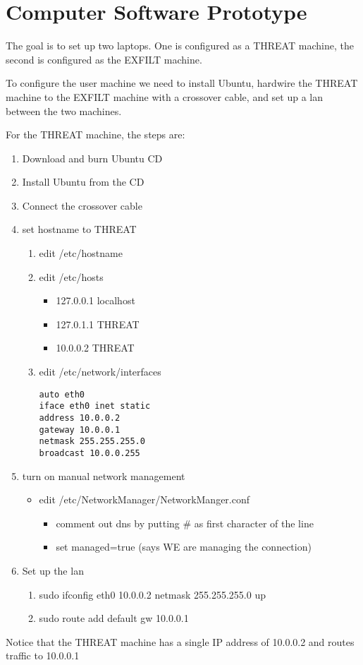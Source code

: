 \chapter{Computer Software Prototype}

The goal is to set up two laptops. One is configured as a THREAT
machine, the second is configured as the EXFILT machine.

To configure the user machine we need to install Ubuntu,
hardwire the THREAT machine to the EXFILT machine with a
crossover cable, and set up a lan between the two machines.

For the THREAT machine, the steps are:
\begin{enumerate}
\item Download and burn Ubuntu CD
\item Install Ubuntu from the CD
\item Connect the crossover cable
\item set hostname to THREAT
\begin{enumerate}
\item edit /etc/hostname
\item edit /etc/hosts
\begin{itemize}
\item 127.0.0.1 localhost
\item 127.0.1.1 THREAT
\item 10.0.0.2  THREAT
\end{itemize}
\item edit /etc/network/interfaces
\begin{verbatim}
auto eth0
iface eth0 inet static
address 10.0.0.2
gateway 10.0.0.1
netmask 255.255.255.0
broadcast 10.0.0.255
\end{verbatim}
\end{enumerate}
\item turn on manual network management 
\begin{itemize}
\item edit /etc/NetworkManager/NetworkManger.conf
\begin{itemize}
\item comment out dns by putting \# as first character of the line
\item set managed=true  (says WE are managing the connection)
\end{itemize}
\end{itemize}
\item Set up the lan
\begin{enumerate}
\item sudo ifconfig eth0 10.0.0.2 netmask 255.255.255.0 up
\item sudo route add default gw 10.0.0.1
\end{enumerate}
\end{enumerate}
Notice that the THREAT machine has a single IP address of 10.0.0.2
and routes traffic to 10.0.0.1

